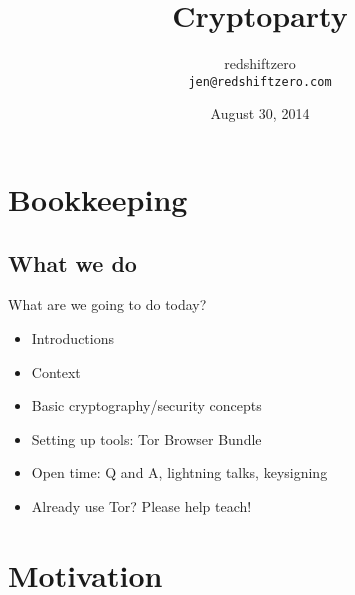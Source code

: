 \documentclass{beamer}
\author[redshiftzero]{redshiftzero\\ \texttt{jen@redshiftzero.com}}
\institute[SSH:C]{Southside Hackerspace: Chicago}
\title[Cryptoparty]{Cryptoparty}
\date[August 2014]{August 30, 2014}
\begin{document}
\begin{frame}[plain]
   \titlepage
\end{frame}


\section{Bookkeeping}
\subsection{What we do}

\begin{frame}{What are we going to do today?}

\begin{itemize}
  \item Introductions
  \item Context 
  \item Basic cryptography/security concepts
  \item Setting up tools: Tor Browser Bundle
  \item Open time: Q and A, lightning talks, keysigning 
  \item Already use Tor? Please help teach!
\end{itemize}

\end{frame}

\section{Motivation}
\subsection{}
\end{document}
